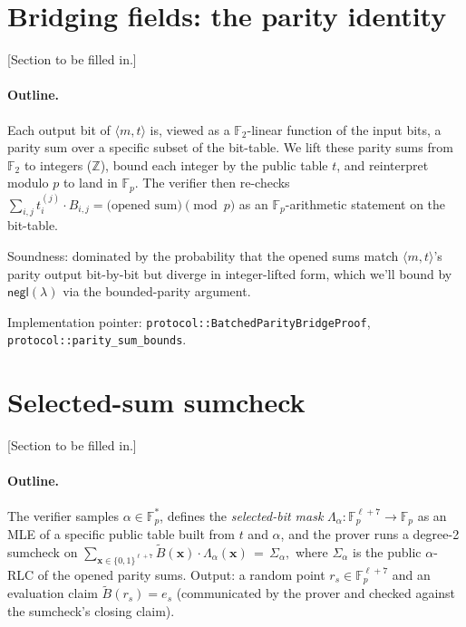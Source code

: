 \documentclass[11pt,a4paper]{article}
\theoremstyle{definition}
\theoremstyle{remark}
\newcommand{\akF}{\mathbb{F}_{p}}                %
\newcommand{\GF}[1]{\mathbb{F}_{#1}}             %
\newcommand{\MLE}[1]{\widetilde{#1}}              %
\newcommand{\BitTable}{B}                         %
\newcommand{\Transparent}{t}                      %
\newcommand{\Message}{m}                          %
\newcommand{\selectedPoint}{r_s}                  %
\newcommand{\evalSelected}{e_s}                   %
\newcommand{\bits}{\{0,1\}}
\newcommand{\negl}{\mathsf{negl}}
\begin{document}
\section{Bridging fields: the parity identity}
\label{sec:parity-bridge}

\textsf{[Section to be filled in.]}

\paragraph{Outline.}
Each output bit of $\langle \Message, \Transparent \rangle$ is, viewed as
a $\GF{2}$-linear function of the input bits, a parity sum over a
specific subset of the bit-table. We lift these parity sums from
$\GF{2}$ to integers ($\mathbb{Z}$), bound each integer by the public
table $\Transparent$, and reinterpret modulo $p$ to land in $\akF$. The
verifier then re-checks
\(
   \sum_{i,j} \Transparent^{(j)}_i \cdot \BitTable_{i,j}
   = \text{(opened sum)} \pmod p
\)
as an $\akF$-arithmetic statement on the bit-table.

Soundness: dominated by the probability that the opened sums match
$\langle \Message, \Transparent \rangle$'s parity output bit-by-bit but
diverge in integer-lifted form, which we'll bound by $\negl(\lambda)$ via
the bounded-parity argument.

Implementation pointer: \verb|protocol::BatchedParityBridgeProof|,
\verb|protocol::parity_sum_bounds|.


\section{Selected-sum sumcheck}
\label{sec:selected-sum}

\textsf{[Section to be filled in.]}

\paragraph{Outline.}
The verifier samples $\alpha \in \akF^*$, defines the
\emph{selected-bit mask}
$\Lambda_\alpha : \akF^{\ell + 7} \to \akF$ as an MLE of a specific
public table built from $\Transparent$ and $\alpha$, and the prover runs
a degree-2 sumcheck on
\(
   \sum_{\mathbf{x} \in \bits^{\ell+7}} \MLE{\BitTable}(\mathbf{x}) \cdot
   \Lambda_\alpha(\mathbf{x}) \,=\, \Sigma_\alpha,
\)
where $\Sigma_\alpha$ is the public $\alpha$-RLC of the opened parity
sums. Output: a random point $\selectedPoint \in \akF^{\ell + 7}$ and an
evaluation claim $\MLE{\BitTable}(\selectedPoint) = \evalSelected$
(communicated by the prover and checked against the sumcheck's closing
claim).
\end{document}
